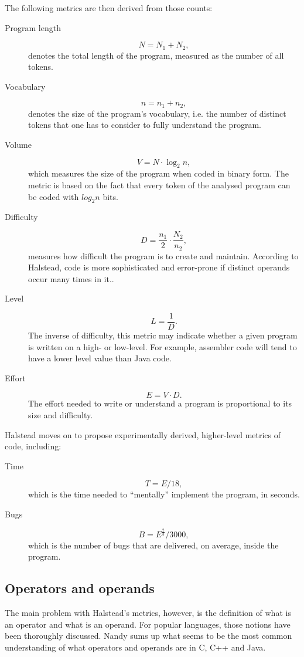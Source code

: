 \documentclass[11pt,a4paper,twoside]{article}
\begin{document}
\begin{multicols}{2}
The following metrics are then derived from those counts:
\begin{description}
\item[Program length]
  $$N = N_1 + N_2,$$ denotes the total length of the program, measured
  as the number of all tokens.
\item[Vocabulary]
  $$n = n_1 + n_2,$$ denotes the size of the program's vocabulary,
  i.e.  the number of distinct tokens that one has to consider to
  fully understand the program.
\item[Volume]
  $$V = N \cdot \log_2n,$$ which measures the size of the program when
  coded in binary form. The metric is based on the fact that every
  token of the analysed program can be coded with $log_2n$ bits.
\item[Difficulty]
  $$D = \frac{n_1}{2}\cdot\frac{N_2}{n_2},$$ measures how difficult
  the program is to create and maintain. According to Halstead, code
  is more sophisticated and error-prone if distinct operands occur
  many times in it..
\item[Level]
  $$L = \frac{1}{D}.$$ The inverse of difficulty, this metric may
  indicate whether a given program is written on a high- or
  low-level. For example, assembler code will tend to have a lower
  level value than Java code.
\item[Effort]
  $$E = V \cdot D.$$ The effort needed to write or understand a
  program is proportional to its size and difficulty.
\end{description}

Halstead moves on to propose experimentally derived, higher-level
metrics of code, including:
\begin{description}
\item[Time]
$$T = E/18,$$ which is the time needed to ``mentally'' implement the
  program, in seconds.
\item[Bugs]
$$B = E^{\frac{2}{3}}/3000,$$ which is the number of bugs that are
  delivered, on average, inside the program.
\end{description}

\subsection{Operators and operands}
The main problem with Halstead's metrics, however, is the definition
of what is an operator and what is an operand. For popular languages,
those notions have been thoroughly discussed. Nandy \cite{nandy} sums
up what seems to be the most common understanding of what operators
and operands are in C, C++ and Java. 


\end{multicols}
\end{document}
